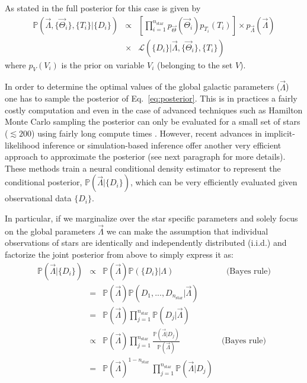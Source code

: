 \documentclass{aa}
\begin{document}
As stated in \citet{Philcox_2019} the full posterior for this case is given by 
\begin{eqnarray}\label{eq:posterior}
    \mathbb{P}(\vec\Lambda,\{\vec\Theta_i\},\{T_i\}|\{D_i\}) &\propto&  \left[\prod_{i=1}^{n_\mathrm{star}}p_{\vec\Theta}(\vec\Theta_i)p_{T_i}(T_i)\right]
    \times p_{\vec\Lambda}(\vec\Lambda)\\
    \nonumber
    &\times& \mathcal{L}(\{D_i\}|\vec\Lambda,\{\vec\Theta_i\},\{T_i\})
\end{eqnarray}
where $p_V(V_i)$ is the prior on variable $V_i$ (belonging to the set $V$).

In order to determine the optimal values of the global galactic parameters ($\Vec{\Lambda}$) one has to sample the posterior of Eq.~\ref{eq:posterior}. This is in practices a fairly costly computation and even in the case of advanced techniques such as Hamilton Monte Carlo sampling the posterior can only be evaluated for a small set of stars ($\lesssim200$) using fairly long compute times \citep[$\sim40$ hours][]{Philcox_2019}.
%
However, recent advances in implicit-likelihood inference or simulation-based inference \citep{Cranmer2020} offer another very efficient approach to approximate the posterior (see next paragraph for more details). These methods train a neural conditional density estimator to represent the conditional posterior, $\mathbb{P}(\vec\Lambda|\{D_i\})$, which can be very efficiently evaluated given observational data $\{D_i\}$.

In particular, if we marginalize over the star specific parameters and solely focus on the global parameters $\Vec{\Lambda}$ we can make the assumption that individual observations of stars are identically and independently distributed (i.i.d.) and factorize the joint posterior from above to simply express it as:  %
\begin{eqnarray}\label{eq:posterior}
\mathbb{P}(\vec\Lambda|\{D_i\}) &\propto& 
\mathbb{P}(\vec\Lambda)\mathbb{P}(\{D_i\}|\Lambda)\quad\quad\quad\quad\quad\quad\,\, \text{(Bayes rule)}
\\\nonumber
&=&
\mathbb{P}(\vec\Lambda)\mathbb{P}
(D_1,...,D_{n_\mathrm{star}}|\vec\Lambda)
\\\nonumber
&=& \mathbb{P}(\vec\Lambda)\prod_{j=1}^{n_\mathrm{star}}\mathbb{P}(D_j|\vec\Lambda) 
\\\nonumber
&\propto& \mathbb{P}(\vec\Lambda) \prod_{j=1}^{n_\mathrm{star}}\frac{\mathbb{P}(\vec\Lambda|D_j)}{\mathbb{P}(\vec\Lambda)} \quad\quad\quad\quad\quad\text{(Bayes rule)}
\\\nonumber
&=& \mathbb{P}(\vec\Lambda)^{1-n_\mathrm{star}}\ \prod_{j=1}^{n_\mathrm{star}}\mathbb{P}(\vec\Lambda|D_j) 
\end{eqnarray}
\end{document}
